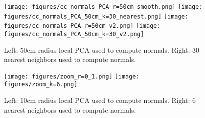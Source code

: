 \documentclass[a4paper]{article}
\begin{document}
\begin{figure}[ht]
  \centering
  \texttt{[image: figures/cc\_normals\_PCA\_r=50cm\_smooth.png]}
  \texttt{[image: figures/cc\_normals\_PCA\_50cm\_k=30\_nearest.png]}
  \texttt{[image: figures/cc\_normals\_PCA\_r=50cm\_v2.png]}
  \texttt{[image: figures/cc\_normals\_PCA\_50cm\_k=30\_v2.png]}
  \caption{Left: 50cm radius local PCA used to compute normals. 
  Right: 30 nearest neighbors used to compute normals.} 
  \label{fig:local_PCA_neighbor}
\end{figure}




\begin{figure}[ht]
  \centering
  \texttt{[image: figures/zoom\_r=0\_1.png]}
  \texttt{[image: figures/zoom\_k=6.png]}
  \caption{Left: 10cm radius local PCA used to compute normals. 
  Right: 6 nearest neighbors used to compute normals.} 
  \label{fig:local_PCA_neighbor_zoom}
\end{figure}
\end{document}
